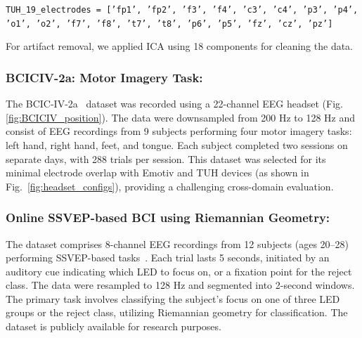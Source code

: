 \documentclass{article} %
\begin{document}
\texttt{TUH\_19\_electrodes = ['fp1', 'fp2', 'f3', 'f4', 'c3', 'c4', 'p3', 'p4', 'o1', 'o2', 'f7', 'f8', 't7', 't8', 'p6', 'p5', 'fz', 'cz', 'pz']}

For artifact removal, we applied ICA using 18 components for cleaning the data.


\subsubsection{\textbf{BCICIV-2a: Motor Imagery Task}:} 
The BCIC-IV-2a~\cite{BCICIV2A} dataset was recorded using a 22-channel EEG headset (Fig.\ref{fig:BCICIV_position}). The data were downsampled from 200 Hz to 128 Hz and consist of EEG recordings from 9 subjects performing four motor imagery tasks: left hand, right hand, feet, and tongue. Each subject completed two sessions on separate days, with 288 trials per session. This dataset was selected for its minimal electrode overlap with Emotiv and TUH devices (as shown in Fig.~\ref{fig:headset_configs}), providing a challenging cross-domain evaluation. 

\subsubsection{\textbf{Online SSVEP-based BCI using Riemannian Geometry}:}
The dataset comprises 8-channel EEG recordings from 12 subjects (ages 20–28) performing SSVEP-based tasks~\citep{SSVEP}. Each trial lasts 5 seconds, initiated by an auditory cue indicating which LED to focus on, or a fixation point for the reject class. The data were resampled to 128 Hz and segmented into 2-second windows. The primary task involves classifying the subject's focus on one of three LED groups or the reject class, utilizing Riemannian geometry for classification. The dataset is publicly available for research purposes.
\end{document}
